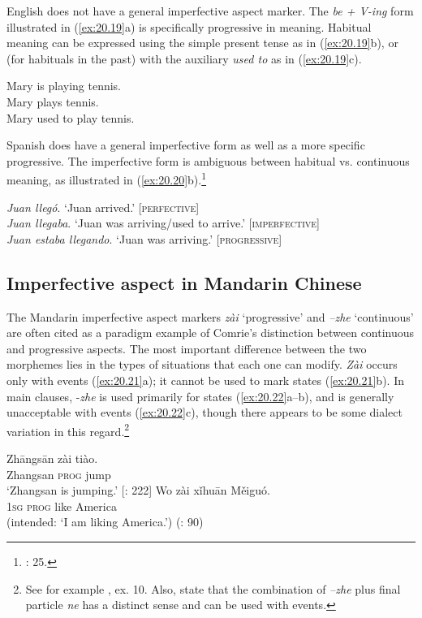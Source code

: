 English does not have a general imperfective aspect marker. The \textit{be + V-ing} form illustrated in (\ref{ex:20.19}a) is specifically progressive in meaning. Habitual meaning can be expressed using the simple present tense as in (\ref{ex:20.19}b), or (for habituals in the past) with the auxiliary \textit{used to} as in (\ref{ex:20.19}c).


\ea \label{ex:20.19}
\ea  Mary is playing tennis.\\
\ex Mary plays tennis.\\
\ex Mary used to play tennis.
                       \z
\z


Spanish does have a general imperfective form as well as a more specific progressive. The imperfective form is ambiguous between habitual vs. continuous meaning, as illustrated in (\ref{ex:20.20}b).\footnote{\citealt{Comrie1976}: 25.}


\ea \label{ex:20.20}
\ea  \textit{Juan llegó}.  ‘Juan arrived.’  [\textsc{perfective}]\\
\ex \textit{Juan llegaba}.  ‘Juan was arriving/used to arrive.’  [\textsc{imperfective}]\\
\ex \textit{Juan estaba llegando}.  ‘Juan was arriving.’  [\textsc{progressive}]
                       \z
\z

\subsection{Imperfective aspect in Mandarin Chinese}\label{sec:20.4.2}

The Mandarin imperfective aspect markers \textit{zài} ‘progressive’ and \textit{–zhe} ‘continuous’ are often cited as a paradigm example of Comrie’s distinction between continuous and progressive aspects. The most important difference between the two morphemes lies in the types of situations that each one can modify. \textit{Zài} occurs only with events (\ref{ex:20.21}a); it cannot be used to mark states (\ref{ex:20.21}b). In main clauses, -\textit{zhe} is used primarily for states (\ref{ex:20.22}a--b), and is generally unacceptable with events (\ref{ex:20.22}c), though there appears to be some dialect variation in this regard.\footnote{See for example \citet[738]{KleinEtAl2000}, ex. 10. Also, \citet{LiThompson1981} state that the combination of \textit{–zhe} plus final particle \textit{ne} has a distinct sense and can be used with events.}

\ea \label{ex:20.21}
\ea  \gll  Zhāngsān  zài  tiào.\\
Zhangsan  \textsc{prog}  jump\\
\glt ‘Zhangsan is jumping.’   [\citealt{LiThompson1981}: 222]
\ex \gll  *Wo  zài  xǐhuān  Měiguó.\\
  \textsc{1sg}  \textsc{prog}  like  America\\
\glt (intended: ‘I am liking America.’)  (\citealt{Sun2011}: 90)
\z \z

